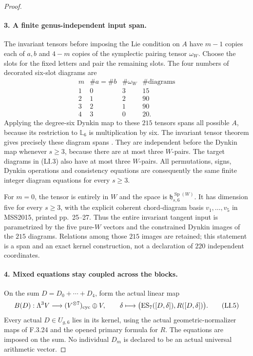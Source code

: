 \begin{proof}
\paragraph{3. A finite genus-independent input span.}
The invariant tensors before imposing the Lie condition on
$A$ have $m-1$ copies each of $a,b$ and $4-m$ copies of the
symplectic pairing tensor $\omega_W$. Choose the slots for
the fixed letters and pair the remaining slots. The four
numbers of decorated six-slot diagrams are
\[
 \begin{array}{c|r|r|r}
 m&\#a=\#b&\#\omega_W&\#\text{diagrams}\\\hline
 1&0&3&15\\
 2&1&2&90\\
 3&2&1&90\\
 4&3&0&20.
 \end{array}                                                \tag{LI.4}
\]
Applying the degree-six Dynkin map to these $215$ tensors
spans all possible $A$, because its restriction to
$\mathbb L_6$ is multiplication by six. The invariant
tensor theorem gives precisely these diagram spans
\cite[Proposition~2.1, p.~8]{AuditMoritaSakasaiSuzuki2015v2}. They
are independent before the Dynkin map whenever $s\geq3$,
because there are at most three $W$-pairs. The target
diagrams in (LI.3) also have at most three $W$-pairs.
All permutations, signs, Dynkin operations and consistency
equations are consequently the same finite integer
diagram equations for every $s\geq3$.

For $m=0$, the tensor is entirely in $W$ and the space is
$\mathfrak h_{s,6}^{\operatorname{Sp}(W)}$. It has dimension
five for every $s\geq3$, with the explicit coherent
chord-diagram basis $v_1,\ldots,v_5$ in MSS2015,
printed pp.~25--27\cite{AuditMoritaSakasaiSuzuki2015v2}. Thus the entire invariant tangent
input is parametrized by the five pure-$W$ vectors and
the constrained Dynkin images of the $215$ diagrams.
Relations among those $215$ images are retained; this
statement is a span and an exact kernel construction,
not a declaration of $220$ independent coordinates.

\paragraph{4. Mixed equations stay coupled across the blocks.}
On the sum $D=D_0+\cdots+D_4$, form the actual linear map
\[
 B(D):\Lambda^3V\longrightarrow
       (V^{\otimes7})_{\rm cyc}\oplus V,\qquad
 \delta\longmapsto
   \bigl(\operatorname{ES}_7([D,\delta]),R([D,\delta])\bigr).
                                                               \tag{LI.5}
\]
Every actual $D\in U_{g,6}$ lies in its kernel, using the
actual geometric-normalizer maps of F.3.24 and the opened
primary formula for $R$\cite[Proposition~4.1, p.~11]{AuditMoritaSakasaiSuzuki2026v1}. The equations
are imposed on the sum. No individual $D_m$ is declared
to be an actual universal arithmetic vector.


\end{proof}
